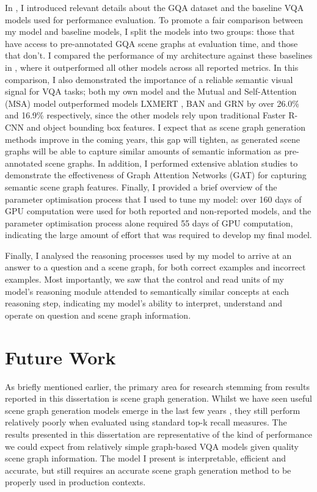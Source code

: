 In \chapterautorefname{ \ref{chapter:evaluation}}, I introduced relevant details about the GQA dataset and the baseline VQA models used for performance evaluation. To promote a fair comparison between my model and baseline models, I split the models into two groups: those that have access to pre-annotated GQA scene graphs at evaluation time, and those that don't. I compared the performance of my architecture against these baselines in \chapterautorefname{ \ref{chapter:results}}, where it outperformed all other models across all reported metrics. In this comparison, I also demonstrated the importance of a reliable semantic visual signal for VQA tasks; both my own model and the Mutual and Self-Attention (MSA) model outperformed models LXMERT \cite{tang2019learning}, BAN \cite{kim2018bilinear} and GRN \cite{guo2019bilinear} by over 26.0\% and 16.9\% respectively, since the other models rely upon traditional Faster R-CNN \cite{ren2016faster} and object bounding box features. I expect that as scene graph generation methods improve in the coming years, this gap will tighten, as generated scene graphs will be able to capture similar amounts of semantic information as pre-annotated scene graphs. In addition, I performed extensive ablation studies to demonstrate the effectiveness of Graph Attention Networks (GAT) for capturing semantic scene graph features. Finally, I provided a brief overview of the parameter optimisation process that I used to tune my model: over 160 days of GPU computation were used for both reported and non-reported models, and the parameter optimisation process alone required 55 days of GPU computation, indicating the large amount of effort that was required to develop my final model.

Finally, I analysed the reasoning processes used by my model to arrive at an answer to a question and a scene graph, for both correct examples and incorrect examples. Most importantly, we saw that the control and read units of my model's reasoning module attended to semantically similar concepts at each reasoning step, indicating my model's ability to interpret, understand and operate on question and scene graph information.

\section{Future Work}

As briefly mentioned earlier, the primary area for research stemming from results reported in this dissertation is scene graph generation. Whilst we have seen useful scene graph generation models emerge in the last few years \cite{yang2018graph, tang2019learning}, they still perform relatively poorly when evaluated using standard top-k recall measures. The results presented in this dissertation are representative of the kind of performance we could expect from relatively simple graph-based VQA models given quality scene graph information. The model I present is interpretable, efficient and accurate, but still requires an accurate scene graph generation method to be properly used in production contexts.

